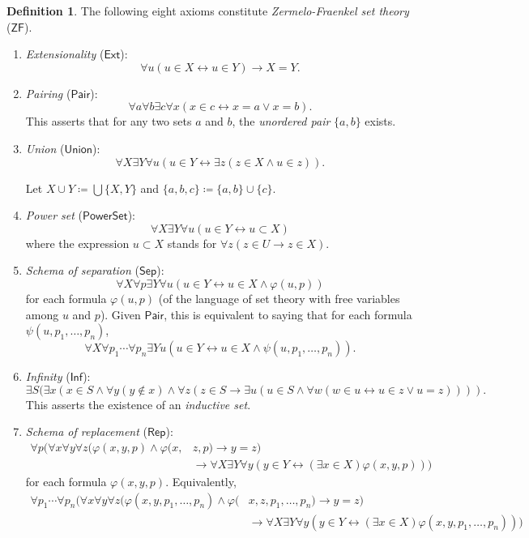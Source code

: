\documentclass[10pt,letterpaper,cm]{nupset}
\theoremstyle{definition}
\newtheorem{definition}{Definition}[subsection]
\theoremstyle{theorem}
\theoremstyle{remark}
\newcommand{\1}{\mathbf{1}}
\newcommand{\0}{\vec 0}
\newcommand{\zf}{\mathsf{ZF}}
\begin{document}
\begin{definition}
 The following eight axioms constitute \textit{Zermelo-Fraenkel set theory} ($\zf$). 
\begin{enumerate}
\item \textit{Extensionality} ($\mathsf{Ext}$):
\[
\forall u(u \in X \leftrightarrow u \in Y) \rightarrow X=Y.
\]
\item \textit{Pairing} ($\mathsf{Pair}$):
\[
\forall a \forall b \exists c \forall x(x \in c \leftrightarrow x=a \vee x=b).
\]
This asserts that for any two sets $a$ and $b$, the \textit{unordered pair} $\{a,b\}$ exists. 
\item \textit{Union} ($\mathsf{Union}$):
\[
\forall X \exists Y \forall u(u \in Y \leftrightarrow \exists z(z \in X \wedge u \in z)).
\]

Let $X \cup Y \coloneqq \bigcup \{X, Y\}$ and $\{a,b,c\} \coloneqq \{a,b\} \cup \{c\}$.
\item \textit{Power set}  ($\mathsf{PowerSet}$):
\[
\forall X \exists Y \forall u(u \in Y \leftrightarrow u \subset X)
\]
where the expression $u \subset X$ stands for $\forall z(z \in U \rightarrow z \in X)$.
\item \textit{Schema of separation} ($\mathsf{Sep}$):
\[
\forall X \forall p \exists Y \forall u(u \in Y \leftrightarrow u \in X \wedge \varphi(u, p))
\]
for each formula $\varphi(u, p)$ (of the language of set theory with free variables among $u$ and $p$). Given $\mathsf{Pair}$, this is equivalent to saying that for each formula $\psi(u, p_1, \ldots, p_n)$,
\[\forall X \forall p_{1} \cdots \forall p_{n} \exists Y u\left(u \in Y \leftrightarrow u \in X \wedge \psi\left(u, p_{1}, \ldots, p_{n}\right)\right).\] 
\item \textit{Infinity} ($\mathsf{Inf}$):
\[
\exists S(\exists x(x\in S\land\forall y(y\notin x)\land\forall z(z\in S\rightarrow\exists u(u\in S\land\forall w(w\in u\leftrightarrow u\in z\lor u=z)))).
\]
This asserts the existence of an \textit{inductive set}. 
\item \textit{Schema of replacement} ($\mathsf{Rep}$):
\[
\begin{aligned} \forall p( \forall x \forall y \forall z(\varphi(x, y, p) \wedge \varphi(x,& z, p ) \rightarrow y=z ) \\ & \rightarrow \forall X \exists Y \forall y(y \in Y \leftrightarrow(\exists x \in X) \varphi(x, y, p)) )\end{aligned}
\] for each formula $\varphi(x,y, p)$. Equivalently, 
\[
\begin{aligned} \forall p_1 \cdots \forall p_n( \forall x \forall y \forall z(\varphi(x, y, p_1, \ldots, p_n) \wedge \varphi(&x, z, p_1, \ldots, p_n ) \rightarrow y=z ) \\ & \rightarrow \forall X \exists Y \forall y(y \in Y \leftrightarrow(\exists x \in X) \varphi(x, y, p_1, \ldots, p_n)) ) \end{aligned}
\]
\end{enumerate}
\end{definition}
\end{document}
